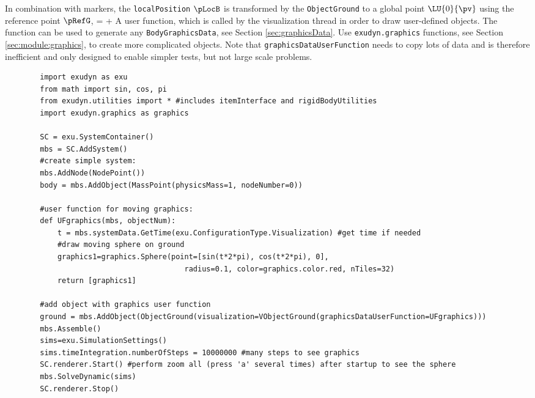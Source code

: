     In combination with markers, the \texttt{localPosition} $\pLocB$ is transformed by the \texttt{ObjectGround} to
    a global point $\LU{0}{\pv}$ using the reference point $\pRefG$,
    \be
       = \pRefG +  \pLocB \eqDot
    \ee
    A user function, which is called by the visualization thread in order to draw user-defined objects.
    The function can be used to generate any \texttt{BodyGraphicsData}, see Section \ref{sec:graphicsData}.
    Use \texttt{exudyn.graphics} functions, see Section \ref{sec:module:graphics}, to create more complicated objects. 
    Note that \texttt{graphicsDataUserFunction} needs to copy lots of data and is therefore
    inefficient and only designed to enable simpler tests, but not large scale problems.
    \finishTable
    \userFunctionExample{}
    \pythonstyle\begin{lstlisting}
        import exudyn as exu
        from math import sin, cos, pi
        from exudyn.utilities import * #includes itemInterface and rigidBodyUtilities
        import exudyn.graphics as graphics

        SC = exu.SystemContainer()
        mbs = SC.AddSystem()
        #create simple system:
        mbs.AddNode(NodePoint())
        body = mbs.AddObject(MassPoint(physicsMass=1, nodeNumber=0))
        
        #user function for moving graphics:
        def UFgraphics(mbs, objectNum):
            t = mbs.systemData.GetTime(exu.ConfigurationType.Visualization) #get time if needed
            #draw moving sphere on ground
            graphics1=graphics.Sphere(point=[sin(t*2*pi), cos(t*2*pi), 0], 
                                         radius=0.1, color=graphics.color.red, nTiles=32)
            return [graphics1] 

        #add object with graphics user function
        ground = mbs.AddObject(ObjectGround(visualization=VObjectGround(graphicsDataUserFunction=UFgraphics)))
        mbs.Assemble()
        sims=exu.SimulationSettings()
        sims.timeIntegration.numberOfSteps = 10000000 #many steps to see graphics
        SC.renderer.Start() #perform zoom all (press 'a' several times) after startup to see the sphere
        mbs.SolveDynamic(sims)
        SC.renderer.Stop()
    \end{lstlisting}

